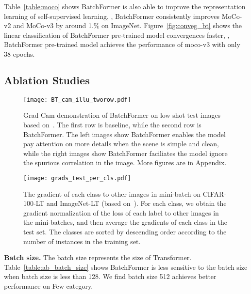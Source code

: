 \documentclass[10pt,twocolumn,letterpaper]{article}
\begin{document}
Table~\ref{table:moco} shows BatchFormer is also able to improve the representation learning of self-supervised learning, \eg, BatchFormer consistently improves MoCo-v2 and MoCo-v3 by around 1.\% on ImageNet. Figure~\ref{fig:conveg_bt} shows the linear classification of BatchFormer pre-trained model convergences faster, \eg, BatchFormer pre-trained model achieves the performance of moco-v3 with only 38 epochs.



\subsection{Ablation Studies}
\label{sec:ab}






\begin{figure*}
    \centering
    \texttt{[image: BT\_cam\_illu\_tworow.pdf]}
\caption{Grad-Cam demonstration of BatchFormer on low-shot test images based on~\cite{ren2020balanced}. The first row is baseline, while the second row is BatchFormer. The left images show BatchFormer enables the model pay attention on more details when the scene is simple and clean, while the right images show BatchFormer faciliates the model ignore the spurious correlation in the image. More figures are in Appendix.}
    \label{fig:cam_illu}
\end{figure*}

\begin{figure}
    \centering
    \texttt{[image: grads\_test\_per\_cls.pdf]}
    \caption{The gradient of each class to other images in mini-batch on CIFAR-100-LT and ImageNet-LT (based on~\cite{ren2020balanced}). For each class, we obtain the gradient normalization of the loss of each label to other images in the mini-batches, and then average the gradients of each class in the test set. The classes are sorted by descending order according to the number of instances in the training set.}
    \label{fig:grad}
\end{figure}











{\bf Batch size.} The batch size represents the size of Transformer. Table~\ref{table:ab_batch_size} shows BatchFormer is less sensitive to the batch size when batch size is less than 128. We find batch size 512 achieves better performance on Few category.
\end{document}
